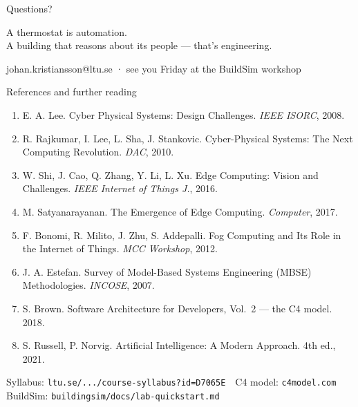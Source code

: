 \documentclass[aspectratio=169]{beamer}
\newcommand{\hilite}[1]{\textcolor{accentColor}{#1}}
\newcommand{\subtle}[1]{\textcolor{subtleColor}{#1}}
\begin{document}
\begin{frame}{}
	\begin{center}
		{\Huge \hilite{Questions?}}

		\vspace{1.5em}
		{\large A thermostat is automation.\\[4pt]
		A building that reasons about its people — \hilite{that's engineering.}}

		\vspace{2em}
		\subtle{johan.kristiansson@ltu.se \;·\; see you Friday at the BuildSim workshop}
	\end{center}
\end{frame}

\begin{frame}{References and further reading}
	\footnotesize
	\begin{enumerate}
		\item E. A. Lee. Cyber Physical Systems: Design Challenges. \emph{IEEE ISORC}, 2008.
		\item R. Rajkumar, I. Lee, L. Sha, J. Stankovic. Cyber-Physical Systems: The Next
		Computing Revolution. \emph{DAC}, 2010.
		\item W. Shi, J. Cao, Q. Zhang, Y. Li, L. Xu. Edge Computing: Vision and Challenges.
		\emph{IEEE Internet of Things J.}, 2016.
		\item M. Satyanarayanan. The Emergence of Edge Computing. \emph{Computer}, 2017.
		\item F. Bonomi, R. Milito, J. Zhu, S. Addepalli. Fog Computing and Its Role in the
		Internet of Things. \emph{MCC Workshop}, 2012.
		\item J. A. Estefan. Survey of Model-Based Systems Engineering (MBSE) Methodologies.
		\emph{INCOSE}, 2007.
		\item S. Brown. Software Architecture for Developers, Vol.~2 — the C4 model. 2018.
		\item S. Russell, P. Norvig. Artificial Intelligence: A Modern Approach. 4th ed., 2021.
	\end{enumerate}
	\vspace{0.3em}
	Syllabus: \texttt{ltu.se/.../course-syllabus?id=D7065E} \,\textbullet\,
	C4 model: \texttt{c4model.com} \,\textbullet\,
	BuildSim: \texttt{buildingsim/docs/lab-quickstart.md}
\end{frame}
\end{document}
